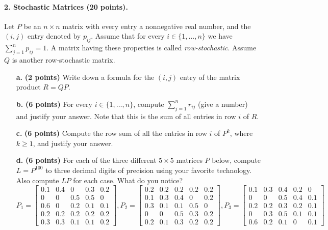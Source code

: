 \documentclass[11pt]{article}
\theoremstyle{definition} \newtheorem{Theorem}{theorem}
\begin{document}
\paragraph{2. Stochastic Matrices (20 points).} Let $P$ be an $n \times n$ matrix with every entry a nonnegative real number, and the $(i,j)$ entry denoted by $p_{ij}$. Assume that for every $i \in \{1,\ldots,n\}$ we have $\sum_{j=1}^n p_{ij}=1$. A matrix having these properties is called \emph{row-stochastic}. Assume $Q$ is another row-stochastic matrix.
\begin{itemize}
  \item[\textbf{a.}] \textbf{(2 points)} Write down a formula for the $(i,j)$ entry of the matrix product $R=QP$.
  \item[\textbf{b.}] \textbf{(6 points)} For every $i \in \{1,\ldots,n\}$, compute  $\sum_{j=1}^n r_{ij}$ (give a number) and justify your answer. Note that this is the sum of all entries in row $i$ of $R$.
  \item[\textbf{c.}] \textbf{(6 points)} Compute the row sum of all the entries in row $i$ of $P^k$, where $k \geq 1$, and justify your answer.
  \item[\textbf{d.}] \textbf{(6 points)} For each of the three different $5 \times 5$ matrices $P$ below, compute $L=P^{100}$ to three decimal digits of precision using your favorite technology. Also compute $LP$ for each case. What do you notice?
    $$
    P_1 = \begin{bmatrix}
      0.1 & 0.4 & 0 & 0.3 & 0.2 \\
      0 & 0 & 0.5 & 0.5 & 0 \\
      0.6 & 0 & 0.2 & 0.1 & 0.1 \\
      0.2 & 0.2 & 0.2 & 0.2 & 0.2 \\
      0.3 & 0.3 & 0.1 & 0.1 & 0.2
    \end{bmatrix},
    P_2 = \begin{bmatrix}
      0.2 & 0.2 & 0.2 & 0.2 & 0.2 \\
      0.1 & 0.3 & 0.4 & 0 & 0.2 \\
      0.3 & 0.1 & 0.1 & 0.5 & 0 \\
      0 & 0 & 0.5 & 0.3 & 0.2 \\
      0.2 & 0.1 & 0.3 & 0.2 & 0.2
    \end{bmatrix},
    P_3 = \begin{bmatrix}
      0.1 & 0.3 & 0.4 & 0.2 & 0 \\
      0 & 0 & 0.5 & 0.4 & 0.1 \\
      0.2 & 0.2 & 0.3 & 0.2 & 0.1 \\
      0 & 0.3 & 0.5 & 0.1 & 0.1 \\
      0.6 & 0.2 & 0.1 & 0 & 0.1
    \end{bmatrix}
    $$
\end{itemize}
\end{document}
